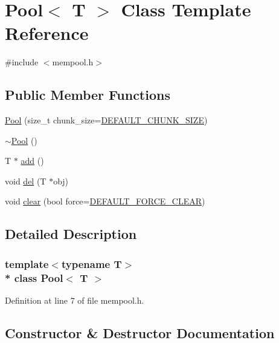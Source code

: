 \hypertarget{classPool}{}\section{Pool$<$ T $>$ Class Template Reference}
\label{classPool}


{\ttfamily \#include $<$mempool.\+h$>$}

\subsection*{Public Member Functions}
\begin{DoxyCompactItemize}
\item 
\hyperlink{classPool_a888aa5ad1715a1e4b7c77b3feb1eabbe}{Pool} (size\+\_\+t chunk\+\_\+size=\hyperlink{mempool_8h_a86261d934fc0037fd4222a4bbe607fdc}{D\+E\+F\+A\+U\+L\+T\+\_\+\+C\+H\+U\+N\+K\+\_\+\+S\+I\+ZE})
\item 
\hyperlink{classPool_ab528bd55fc8b6dde0c9001d710ac7b9f}{$\sim$\+Pool} ()
\item 
T $\ast$ \hyperlink{classPool_a2f4c2e7c9bff98ca50378c65bc173df1}{add} ()
\item 
void \hyperlink{classPool_a45c1e227ab658b1e9a40eafb6d211aff}{del} (T $\ast$obj)
\item 
void \hyperlink{classPool_a96b382bc6687855efde20601ed80f5e4}{clear} (bool force=\hyperlink{mempool_8h_a897472b9024f01f2c26aa6d6805e259f}{D\+E\+F\+A\+U\+L\+T\+\_\+\+F\+O\+R\+C\+E\+\_\+\+C\+L\+E\+AR})
\end{DoxyCompactItemize}


\subsection{Detailed Description}
\subsubsection*{template$<$typename T$>$\\*
class Pool$<$ T $>$}



Definition at line 7 of file mempool.\+h.



\subsection{Constructor \& Destructor Documentation}
